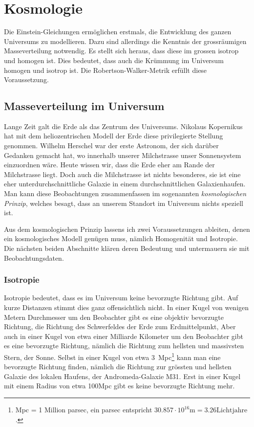 %
%
%
\chapter{Kosmologie%
\label{skript:chapter:kosmologie}}
\rhead{}
Die Einstein-Gleichungen ermöglichen erstmals, die Entwicklung
des ganzen Universums zu modellieren.
Dazu sind allerdings die Kenntnis der grossräumigen
Masseverteilung notwendig.
Es stellt sich heraus, dass diese im grossen isotrop und homogen ist.
Dies bedeutet, dass auch die Krümmung im Universum homogen und isotrop
ist.
Die Robertson-Walker-Metrik erfüllt diese Voraussetzung.

\section{Masseverteilung im Universum}
Lange Zeit galt die Erde als das Zentrum des Universums.
Nikolaus Kopernikus hat mit dem heliozentrischen Modell der Erde
diese privilegierte Stellung genommen.
Wilhelm Herschel war der erste Astronom, der sich darüber Gedanken
gemacht hat, wo innerhalb unserer Milchstrasse unser Sonnensystem
einzuordnen wäre.
Heute wissen wir, dass die Erde eher am Rande der Milchstrasse liegt.
Doch auch die Milchstrasse ist nichts besonderes, sie ist eine eher
unterdurchschnittliche Galaxie in einem durchschnittlichen
Galaxienhaufen.
Man kann diese Beobachtungen zusammenfassen im sogenannten
{\em kosmologischen Prinzip}, welches besagt, dass an unserem
Standort im Universum nichts speziell ist.

Aus dem kosmologischen Prinzip lassens ich zwei Voraussetzungen
ableiten, denen ein kosmologisches Modell genügen muss, nämlich
Homogenität und Isotropie.
Die nächsten beiden Abschnitte klären deren Bedeutung und untermauern
sie mit Beobachtungsdaten.

\subsection{Isotropie}
Isotropie bedeutet, dass es im Universum keine bevorzugte Richtung
gibt.
Auf kurze Distanzen stimmt dies ganz offensichtlich nicht.
In einer Kugel von wenigen Metern Durchmesser um den Beobachter
gibt es eine objektiv bevorzugte Richtung, die Richtung des Schwerfeldes
der Erde zum Erdmittelpunkt,
Aber auch in einer Kugel von etwa einer Milliarde Kilometer um
den Beobachter gibt es eine bevorzugte Richtung, nämlich die
Richtung zum hellsten und massivsten Stern, der Sonne.
Selbst in einer Kugel von etwa 3~Mpc\footnote{Mpc = 1 Million parsec,
ein parsec entspricht $30.857\cdot 10^{16}\text{m} = 3.26\text{Lichtjahre}$.}
kann man eine bevorzugte Richtung finden, nämlich die Richtung zur grössten
und hellsten Galaxie des lokalen Haufens, der Andromeda-Galaxie M31.
Erst in einer Kugel mit einem Radius von etwa 100Mpc gibt es keine
bevorzugte Richtung mehr. 

